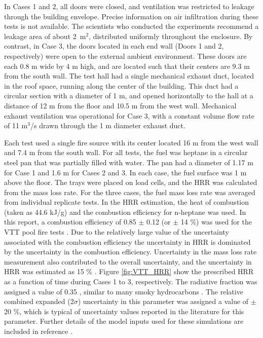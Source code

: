 In Cases 1 and 2, all doors were closed, and ventilation was restricted to leakage through the building envelope. Precise information on air infiltration during these tests is not available. The scientists who conducted the experiments recommend a leakage area of about 2~m$^2$, distributed uniformly throughout the enclosure. By contrast, in Case 3, the doors located in each end wall (Doors 1 and 2, respectively) were open to the external ambient environment. These doors are each 0.8 m wide by 4 m high, and are located such that their centers are 9.3 m from the south wall. The test hall had a single mechanical exhaust duct, located in the roof space, running along the center of the building. This duct had a circular section with a diameter of 1 m, and opened horizontally to the hall at a distance of 12 m from the floor and 10.5 m from the west wall. Mechanical exhaust ventilation was operational for Case 3, with a constant volume flow rate of 11 m$^3$/s drawn through the 1 m diameter exhaust duct. 

Each test used a single fire source with its center located 16 m from the west wall and 7.4 m from the south wall. For all tests, the fuel was heptane in a circular steel pan that was partially filled with water. The pan had a diameter of 1.17 m for Case 1 and 1.6 m for Cases 2 and 3. In each case, the fuel surface was 1 m above the floor. The trays were placed on load cells, and the HRR was calculated from the mass loss rate. For the three cases, the fuel mass loss rate was averaged from individual replicate tests. In the HRR estimation, the heat of combustion (taken as 44.6 kJ/g) and the combustion efficiency for n-heptane was used.  In this report, a combustion efficiency of 0.85 $\pm$ 0.12 (or $\pm$ 14 \%) was used for the VTT pool fire tests \cite{NRCNUREG1824Experimental}. Due to the relatively large value of the uncertainty associated with the combustion efficiency the uncertainty in HRR is dominated by the uncertainty in the combustion efficiency. Uncertainty in the mass loss rate measurement also contributed to the overall uncertainty, and the uncertainty in HRR was estimated as 15 \% \cite{NRCNUREG1824Experimental}. Figure \ref{fig:VTT_HRR} show the prescribed HRR as a function of time during Cases 1 to 3, respectively. The radiative fraction was assigned a value of 0.35 \cite{NRCNUREG1824Experimental}, similar to many smoky hydrocarbons \cite{Hamins:1991}. The relative combined expanded (2$\sigma$) uncertainty in this parameter was assigned a value of $\pm$ 20 \%, which is typical of uncertainty values reported in the literature for this parameter. Further details of the model inputs used for these simulations are included in reference \cite{NRCNUREG1824Experimental}.

